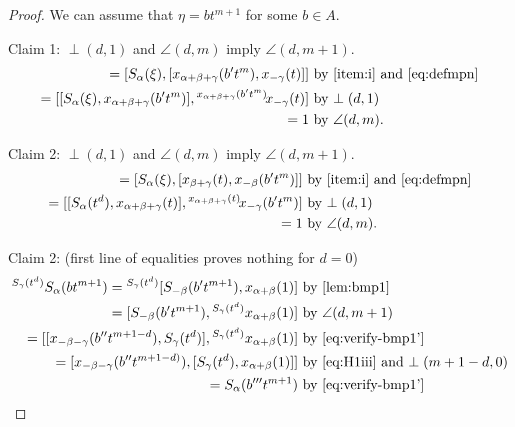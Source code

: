 \documentclass[oneside, 10pt]{amsart}
\numberwithin{equation}{section}
\numberwithin{lemma}{section}
\theoremstyle{definition}
\theoremstyle{remark}
\begin{document}
\begin{proof}
We can assume that $\eta = bt^{m+1}$ for some $b\in A$.

Claim 1: $\perp(d, 1)$ and $\angle(d, m)$ imply $\angle(d, m+1)$.
\begin{align*}
[S_\alpha(\xi), S_{\alpha+\beta}(bt^{m+1})] = [S_\alpha(\xi), [x_{\alpha+\beta+\gamma}(b't^m), x_{-\gamma}(t)]]
 & \text{ by~\eqref{item:i} and~\eqref{eq:defmpn}}\\
 = [[S_\alpha(\xi), x_{\alpha+\beta+\gamma}(b't^m)], {}^{x_{\alpha+\beta+\gamma}(b't^m)}\!x_{-\gamma}(t)]
 & \text{ by~$\perp(d, 1)$}\\
 = 1
 & \text{ by~$\angle(d, m)$.} \end{align*}
 
Claim 2: $\perp(d, 1)$ and $\angle(d, m)$ imply $\angle(d, m+1)$.
 \begin{align*}
[S_\alpha(\xi), S_{\gamma}(bt^{m+1})] = [S_\alpha(\xi), [x_{\beta+\gamma}(t), x_{-\beta}(b't^m)]]
 & \text{ by~\eqref{item:i} and~\eqref{eq:defmpn}}\\
 = [[S_\alpha(t^d), x_{\alpha+\beta+\gamma}(t)], {}^{x_{\alpha+\beta+\gamma}(t)}\!x_{-\gamma}(b't^m)]
 & \text{ by~$\perp(d, 1)$}\\
 = 1
 & \text{ by~$\angle(d, m)$.} \end{align*}

Claim 2: (first line of equalities proves nothing for $d=0$)
\begin{align*}
{}^{S_\gamma(t^d)}S_\alpha(bt^{m+1}) = {}^{S_\gamma(t^d)}[S_{-\beta}(b't^{m+1}), x_{\alpha+\beta}(1)] 
& \text{ by~\cref{lem:bmp1}}\\
 = [S_{-\beta}(b't^{m+1}), {}^{S_\gamma(t^d)}x_{\alpha+\beta}(1)]                                     
 & \text{ by $\angle(d, m+1)$}\\
 = [[x_{-\beta-\gamma}(b''t^{m+1-d}), S_\gamma(t^d)], {}^{S_\gamma(t^d)}x_{\alpha+\beta}(1)]          
 & \text{ by~\eqref{eq:verify-bmp1'}}\\
 = [x_{-\beta-\gamma}(b''t^{m+1-d)}), [S_\gamma(t^d), x_{\alpha+\beta}(1)]]                           
 & \text{ by~\eqref{eq:H1iii} and~$\perp(m+1-d, 0)$}\\
 = S_{\alpha}(b'''t^{m+1})                                                                            
 & \text{ by~\eqref{eq:verify-bmp1'}} \end{align*}
 

\end{proof}
\end{document}
